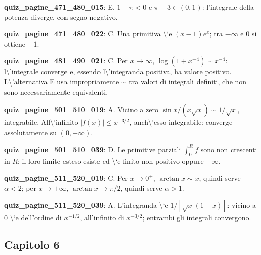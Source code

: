 \documentclass[11pt,a4paper]{article}
\newcounter{quiz}
\begin{document}
\noindent\textbf{quiz\_pagine\_471\_480\_015}: E. $1-\pi<0$ e $\pi-3\in(0,1)$: l'integrale della potenza diverge, con segno negativo.\par\medskip
\noindent\textbf{quiz\_pagine\_471\_480\_022}: C. Una primitiva \textbackslash{}`e $(x-1)e^x$; tra $-\infty$ e $0$ si ottiene $-1$.\par\medskip
\noindent\textbf{quiz\_pagine\_481\_490\_021}: C. Per $x\to\infty$, $\log(1+x^{-4})\sim x^{-4}$: l\textbackslash{}'integrale converge e, essendo l\textbackslash{}'integranda positiva, ha valore positivo. L\textbackslash{}'alternativa E usa impropriamente $\sim$ tra valori di integrali definiti, che non sono necessariamente equivalenti.\par\medskip
\noindent\textbf{quiz\_pagine\_501\_510\_019}: A. Vicino a zero $\sin x/(x\sqrt x)\sim1/\sqrt x$, integrabile. All\textbackslash{}'infinito $|f(x)|\le x^{-3/2}$, anch\textbackslash{}'esso integrabile: converge assolutamente su $(0,+\infty)$.\par\medskip
\noindent\textbf{quiz\_pagine\_501\_510\_039}: D. Le primitive parziali $\int_0^R f$ sono non crescenti in $R$; il loro limite esteso esiste ed \textbackslash{}`e finito non positivo oppure $-\infty$.\par\medskip
\noindent\textbf{quiz\_pagine\_511\_520\_019}: C. Per $x\to0^+$, $\arctan x\sim x$, quindi serve $\alpha<2$; per $x\to+\infty$, $\arctan x\to\pi/2$, quindi serve $\alpha>1$.\par\medskip
\noindent\textbf{quiz\_pagine\_511\_520\_039}: A. L'integranda \textbackslash{}`e $1/[\sqrt{x}(1+x)]$: vicino a $0$ \textbackslash{}`e dell'ordine di $x^{-1/2}$, all'infinito di $x^{-3/2}$; entrambi gli integrali convergono.\par\medskip
\subsection*{Capitolo 6}
\end{document}
